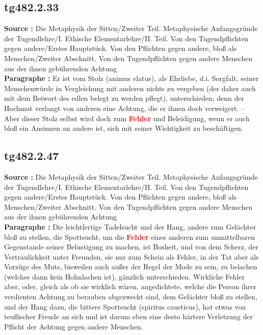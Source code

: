 \documentclass[a4paper,12pt,twoside]{book}
\newcommand{\match}[1]{\textcolor{red}{\textbf{#1}}}
\begin{document}
	\subsection*{tg482.2.33} 
	\textbf{Source : }Die Metaphysik der Sitten/Zweiter Teil. Metaphysische Anfangsgründe der Tugendlehre/I. Ethische Elementarlehre/II. Teil. Von den Tugendpflichten gegen andere/Erstes Hauptstück. Von den Pflichten gegen andere, bloß als Menschen/Zweiter Abschnitt. Von den Tugendpflichten gegen andere Menschen aus der ihnen gebührenden Achtung\\  
	
	\textbf{Paragraphe : }Er ist vom Stolz (animus elatus), als Ehrliebe, d.i. Sorgfalt, seiner Menschenwürde in Vergleichung mit anderen nichts zu vergeben (der daher auch mit dem Beiwort des edlen belegt zu werden pflegt), unterschieden; denn der Hochmut verlangt von anderen eine Achtung, die er ihnen doch verweigert. – Aber dieser Stolz selbst wird doch zum \match{Fehler} und Beleidigung, wenn er auch bloß ein Ansinnen an andere ist, sich mit seiner Wichtigkeit zu beschäftigen. 
	
	\subsection*{tg482.2.47} 
	\textbf{Source : }Die Metaphysik der Sitten/Zweiter Teil. Metaphysische Anfangsgründe der Tugendlehre/I. Ethische Elementarlehre/II. Teil. Von den Tugendpflichten gegen andere/Erstes Hauptstück. Von den Pflichten gegen andere, bloß als Menschen/Zweiter Abschnitt. Von den Tugendpflichten gegen andere Menschen aus der ihnen gebührenden Achtung\\  
	
	\textbf{Paragraphe : }Die leichtfertige Tadelsucht und der Hang, andere zum Gelächter bloß zu stellen, die Spottsucht, um die \match{Fehler} eines anderen zum unmittelbaren Gegenstande seiner Belustigung zu machen, ist Bosheit, und von dem 
	Scherz, der Vertraulichkeit unter Freunden, sie nur zum Schein als Fehler, in der Tat aber als Vorzüge des Muts, bisweilen auch außer der Regel der Mode zu sein, zu belachen (welches dann kein Hohnlachen ist), gänzlich unterschieden. Wirkliche Fehler aber, oder, gleich als ob sie wirklich wären, angedichtete, welche die Person ihrer verdienten Achtung zu berauben abgezweckt sind, dem Gelächter bloß zu stellen, und der Hang dazu, die bittere Spottsucht (spiritus causticus), hat etwas von teuflischer Freude an sich und ist darum eben eine desto härtere Verletzung der Pflicht der Achtung gegen andere Menschen. 
	
\end{document}
